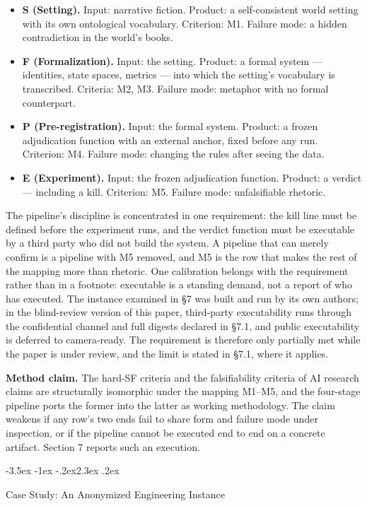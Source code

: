 \documentclass[11pt,a4paper]{article}
\makeatletter
\renewcommand\section{\@startsection{section}{1}{\z@}%
  {-3.5ex \@plus -1ex \@minus -.2ex}{2.3ex \@plus .2ex}%
  {\normalfont\Large\bfseries\raggedright}}
\makeatother
\begin{document}
\begin{itemize}[leftmargin=1.6em,itemsep=2pt,parsep=0pt,topsep=3pt]
\item \textbf{S (Setting).} Input: narrative fiction. Product: a self-consistent world setting with its own ontological vocabulary. Criterion: M1. Failure mode: a hidden contradiction in the world's books.
\item \textbf{F (Formalization).} Input: the setting. Product: a formal system — identities, state spaces, metrics — into which the setting's vocabulary is transcribed. Criteria: M2, M3. Failure mode: metaphor with no formal counterpart.
\item \textbf{P (Pre-registration).} Input: the formal system. Product: a frozen adjudication function with an external anchor, fixed before any run. Criterion: M4. Failure mode: changing the rules after seeing the data.
\item \textbf{E (Experiment).} Input: the frozen adjudication function. Product: a verdict — including a kill. Criterion: M5. Failure mode: unfalsifiable rhetoric.
\end{itemize}

The pipeline's discipline is concentrated in one requirement: the kill line must be defined before the experiment runs, and the verdict function must be executable by a third party who did not build the system. A pipeline that can merely confirm is a pipeline with M5 removed, and M5 is the row that makes the rest of the mapping more than rhetoric. One calibration belongs with the requirement rather than in a footnote: executable is a standing demand, not a report of who has executed. The instance examined in §7 was built and run by its own authors; in the blind-review version of this paper, third-party executability runs through the confidential channel and full digests declared in §7.1, and public executability is deferred to camera-ready. The requirement is therefore only partially met while the paper is under review, and the limit is stated in §7.1, where it applies.

\textbf{Method claim.} The hard-SF criteria and the falsifiability criteria of AI research claims are structurally isomorphic under the mapping M1–M5, and the four-stage pipeline ports the former into the latter as working methodology. The claim weakens if any row's two ends fail to share form and failure mode under inspection, or if the pipeline cannot be executed end to end on a concrete artifact. Section 7 reports such an execution.

\section{Case Study: An Anonymized Engineering Instance}
\end{document}
